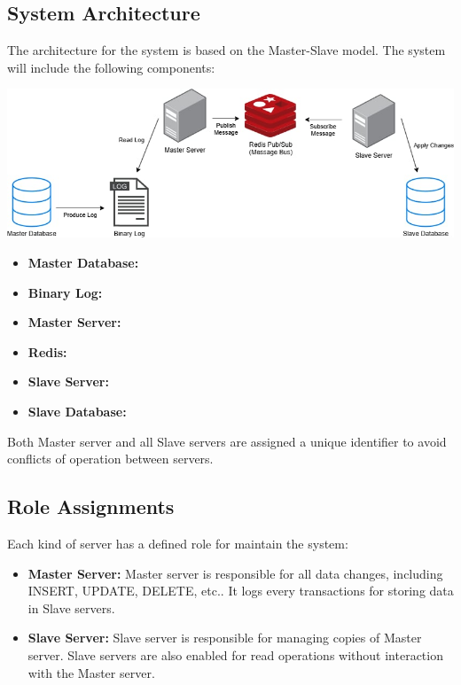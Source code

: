 \documentclass[a4paper,12pt]{report}
\begin{document}
\subsection{System Architecture}
The architecture for the system is based on the Master-Slave model. The system will include the following components:

\includegraphics[width=\textwidth]{distribute_system_architecture.png}

\begin{itemize}
    \item \textbf{Master Database:} 
    \item \textbf{Binary Log:}
    \item \textbf{Master Server:}
    \item \textbf{Redis:}
    \item \textbf{Slave Server:}
    \item \textbf{Slave Database:}
\end{itemize}

Both Master server and all Slave servers are assigned a unique identifier to avoid conflicts of operation between servers.

\subsection{Role Assignments}
Each kind of server has a defined role for maintain the system:
\begin{itemize}
    \item \textbf{Master Server:} Master server is responsible for all data changes, including INSERT, UPDATE, DELETE, etc.. It logs every transactions for storing data in Slave servers.
    \item \textbf{Slave Server:} Slave server is responsible for managing copies of Master server. Slave servers are also enabled for read operations without interaction with the Master server. 
\end{itemize}



\newpage
\end{document}
